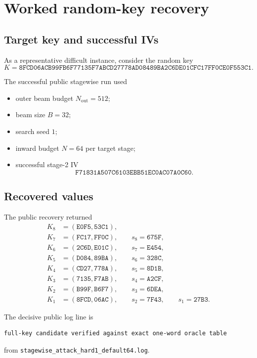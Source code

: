 \documentclass[11pt]{article}
\begin{document}
\section{Worked random-key recovery}
\subsection{Target key and successful IVs}
As a representative difficult instance, consider the random key
\[
K=
\texttt{8FCD06ACB99FB6F77135F7ABCD27778AD08489BA2C6DE01CFC17FF0CE0F553C1}.
\]

The successful public stagewise run used
\begin{itemize}[leftmargin=1.5em]
\item outer beam budget $N_{\mathrm{out}}=512$;
\item beam size $B=32$;
\item search seed $1$;
\item inward budget $N=64$ per target stage;
\item successful stage-2 IV
\[
\texttt{F71831A507C6103EBB51EC0AC07A0C60}.
\]
\end{itemize}

\subsection{Recovered values}
The public recovery returned
\begin{align*}
K_8 &= (\texttt{E0F5},\texttt{53C1}),\\
K_7 &= (\texttt{FC17},\texttt{FF0C}),\qquad s_8=\texttt{675F},\\
K_6 &= (\texttt{2C6D},\texttt{E01C}),\qquad s_7=\texttt{E454},\\
K_5 &= (\texttt{D084},\texttt{89BA}),\qquad s_6=\texttt{328C},\\
K_4 &= (\texttt{CD27},\texttt{778A}),\qquad s_5=\texttt{8D1B},\\
K_3 &= (\texttt{7135},\texttt{F7AB}),\qquad s_4=\texttt{A2CF},\\
K_2 &= (\texttt{B99F},\texttt{B6F7}),\qquad s_3=\texttt{6DEA},\\
K_1 &= (\texttt{8FCD},\texttt{06AC}),\qquad s_2=\texttt{7F43},\qquad s_1=\texttt{27B3}.
\end{align*}

The decisive public log line is
\begin{verbatim}
full-key candidate verified against exact one-word oracle table
\end{verbatim}
from \texttt{stagewise\_attack\_hard1\_default64.log}.
\end{document}
